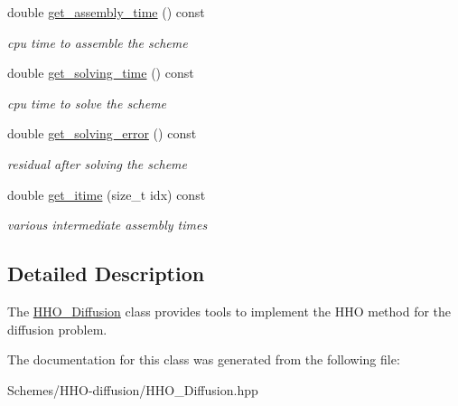 \begin{DoxyCompactItemize}
double \hyperlink{group__HHO__Diffusion_ga4b67f061d06b1aea5a626792a2bddd1e}{get\+\_\+assembly\+\_\+time} () const
\begin{DoxyCompactList}\small\item\em cpu time to assemble the scheme \end{DoxyCompactList}\item 
double \hyperlink{group__HHO__Diffusion_ga0ba01c42bc116f962b6982b27e95b471}{get\+\_\+solving\+\_\+time} () const
\begin{DoxyCompactList}\small\item\em cpu time to solve the scheme \end{DoxyCompactList}\item 
double \hyperlink{group__HHO__Diffusion_gad53ffa4a52af7bf6803e28f36c7e3365}{get\+\_\+solving\+\_\+error} () const
\begin{DoxyCompactList}\small\item\em residual after solving the scheme \end{DoxyCompactList}\item 
double \hyperlink{group__HHO__Diffusion_ga43051dfce03a9f75c33903f1736f4e1a}{get\+\_\+itime} (size\+\_\+t idx) const
\begin{DoxyCompactList}\small\item\em various intermediate assembly times \end{DoxyCompactList}\end{DoxyCompactItemize}


\subsection{Detailed Description}
The \hyperlink{classHArDCore2D_1_1HHO__Diffusion}{H\+H\+O\+\_\+\+Diffusion} class provides tools to implement the H\+HO method for the diffusion problem. 

The documentation for this class was generated from the following file\+:\begin{DoxyCompactItemize}
\item 
Schemes/\+H\+H\+O-\/diffusion/H\+H\+O\+\_\+\+Diffusion.\+hpp\end{DoxyCompactItemize}

